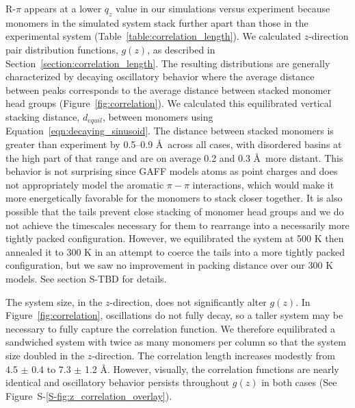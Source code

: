\documentclass[journal=jpcbfk,manuscript=article]{achemso}
\begin{document}

  R-$\pi$ appears at a lower $q_z$ value in our simulations versus experiment because
  monomers in the simulated system stack further apart than those in the experimental
  system (Table~\ref{table:correlation_length}). We calculated $z$-direction pair distribution
  functions, $g(z)$, as described in Section~\ref{section:correlation_length}.
  The resulting distributions are generally characterized by decaying
  oscillatory behavior where the average distance between peaks corresponds to
  the average distance between stacked monomer head groups
  (Figure~\ref{fig:correlation}).  We calculated this equilibrated vertical
  stacking distance, $\mathit{d}_{equil}$, between monomers using
  Equation~\ref{eqn:decaying_sinusoid}. The distance between stacked monomers is
  greater than experiment by 0.5--0.9 \AA~across all cases, with disordered
  basins at the high part of that range and are on average 0.2 and 0.3 \AA~more
  distant. This behavior is
  not surprising since GAFF models atoms as point charges and  %
  does not appropriately model the aromatic $\pi-\pi$ interactions, which would make
  it more energetically favorable for the monomers to stack closer together.  It
  is also possible that the tails prevent close stacking of monomer head groups
  and we do not achieve the timescales necessary for them to rearrange into a
  necessarily more tightly packed configuration. However, we equilibrated the
  system at 500 K then annealed it to 300 K in an attempt to coerce the tails into
  a more tightly packed configuration, but we saw no improvement in packing
  distance over our 300 K models. See section S-TBD for details.

  The system size, in the $z$-direction, does not significantly alter $g(z)$.
  In Figure~\ref{fig:correlation}, oscillations do not fully decay, so a taller
  system may be necessary to fully capture the correlation function. We therefore
  equilibrated a sandwiched system with twice as many monomers per column so that
  the system size doubled in the $z$-direction. The correlation length increases
  modestly from 4.5 $\pm$ 0.4 to 7.3 $\pm$ 1.2 \AA. However, visually, the
  correlation functions are nearly identical and oscillatory behavior persists
  throughout $g(z)$ in both cases (See
  Figure~S-\ref{S-fig:z_correlation_overlay}).
\end{document}
